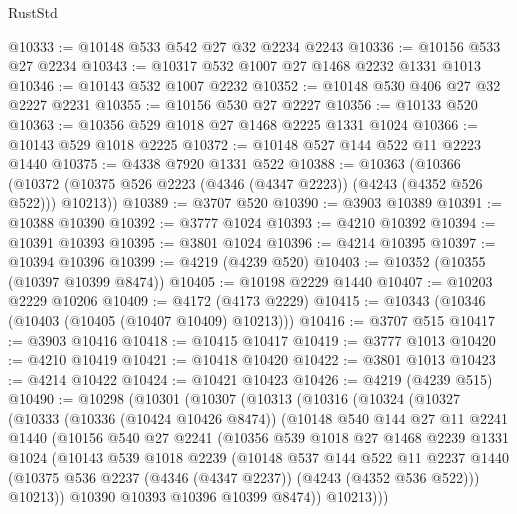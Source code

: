 \begin{lexlean}{RustStd}
\begin{coremodule}
@10333 := @10148 @533 @542 @27 @32 @2234 @2243
@10336 := @10156 @533 @27 @2234
@10343 := @10317 @532 @1007 @27 @1468 @2232 @1331 @1013
@10346 := @10143 @532 @1007 @2232
@10352 := @10148 @530 @406 @27 @32 @2227 @2231
@10355 := @10156 @530 @27 @2227
@10356 := @10133 @520
@10363 := @10356 @529 @1018 @27 @1468 @2225 @1331 @1024
@10366 := @10143 @529 @1018 @2225
@10372 := @10148 @527 @144 @522 @11 @2223 @1440
@10375 := @4338 @7920 @1331 @522
@10388 := @10363
    (@10366 (@10372 (@10375 @526 @2223 (@4346 (@4347 @2223)) (@4243 (@4352 @526 @522))) @10213))
@10389 := @3707 @520
@10390 := @3903 @10389
@10391 := @10388 @10390
@10392 := @3777 @1024
@10393 := @4210 @10392
@10394 := @10391 @10393
@10395 := @3801 @1024
@10396 := @4214 @10395
@10397 := @10394 @10396
@10399 := @4219 (@4239 @520)
@10403 := @10352 (@10355 (@10397 @10399 @8474))
@10405 := @10198 @2229 @1440
@10407 := @10203 @2229 @10206
@10409 := @4172 (@4173 @2229)
@10415 := @10343 (@10346 (@10403 (@10405 (@10407 @10409) @10213)))
@10416 := @3707 @515
@10417 := @3903 @10416
@10418 := @10415 @10417
@10419 := @3777 @1013
@10420 := @4210 @10419
@10421 := @10418 @10420
@10422 := @3801 @1013
@10423 := @4214 @10422
@10424 := @10421 @10423
@10426 := @4219 (@4239 @515)
@10490 := @10298
    (@10301
      (@10307
        (@10313
          (@10316
            (@10324
              (@10327
                (@10333
                  (@10336 (@10424 @10426 @8474))
                  (@10148
                    @540
                    @144
                    @27
                    @11
                    @2241
                    @1440
                    (@10156
                      @540
                      @27
                      @2241
                      (@10356
                        @539
                        @1018
                        @27
                        @1468
                        @2239
                        @1331
                        @1024
                        (@10143
                          @539
                          @1018
                          @2239
                          (@10148
                            @537
                            @144
                            @522
                            @11
                            @2237
                            @1440
                            (@10375 @536 @2237 (@4346 (@4347 @2237)) (@4243 (@4352 @536 @522)))
                            @10213))
                        @10390
                        @10393
                        @10396
                        @10399
                        @8474))
                    @10213)))

\end{coremodule}
\end{lexlean}
